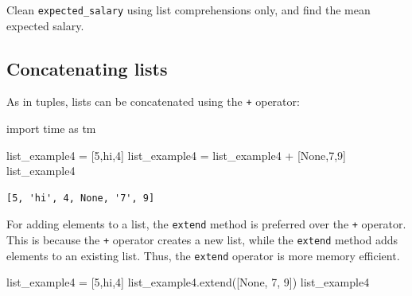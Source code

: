 \documentclass[
  letterpaper,
  DIV=11,
  numbers=noendperiod]{scrreprt}
\newenvironment{Shaded}{\begin{snugshade}}{\end{snugshade}}
\newcommand{\DecValTok}[1]{\textcolor[rgb]{0.68,0.00,0.00}{#1}}
\newcommand{\ImportTok}[1]{\textcolor[rgb]{0.00,0.46,0.62}{#1}}
\newcommand{\NormalTok}[1]{\textcolor[rgb]{0.00,0.23,0.31}{#1}}
\newcommand{\OperatorTok}[1]{\textcolor[rgb]{0.37,0.37,0.37}{#1}}
\newcommand{\StringTok}[1]{\textcolor[rgb]{0.13,0.47,0.30}{#1}}
\newcommand{\VariableTok}[1]{\textcolor[rgb]{0.07,0.07,0.07}{#1}}
\begin{document}
\begin{Shaded}
\begin{Highlighting}[]
}\StringTok{\textquotesingle{}50000\textquotesingle{}}\NormalTok{, }\StringTok{\textquotesingle{}0\textquotesingle{}}\NormalTok{]}
\end{Highlighting}
\end{Shaded}

Clean \texttt{expected\_salary} using list comprehensions only, and find
the mean expected salary.

\hypertarget{concatenating-lists}{%
\subsection{Concatenating lists}\label{concatenating-lists}}

As in tuples, lists can be concatenated using the \texttt{+} operator:

\begin{Shaded}
\begin{Highlighting}[]
\ImportTok{import}\NormalTok{ time }\ImportTok{as}\NormalTok{ tm}
\end{Highlighting}
\end{Shaded}

\begin{Shaded}
\begin{Highlighting}[]
\NormalTok{list\_example4 }\OperatorTok{=}\NormalTok{ [}\DecValTok{5}\NormalTok{,}\StringTok{\textquotesingle{}hi\textquotesingle{}}\NormalTok{,}\DecValTok{4}\NormalTok{] }
\NormalTok{list\_example4 }\OperatorTok{=}\NormalTok{ list\_example4 }\OperatorTok{+}\NormalTok{ [}\VariableTok{None}\NormalTok{,}\StringTok{\textquotesingle{}7\textquotesingle{}}\NormalTok{,}\DecValTok{9}\NormalTok{]}
\NormalTok{list\_example4}
\end{Highlighting}
\end{Shaded}

\begin{verbatim}
[5, 'hi', 4, None, '7', 9]
\end{verbatim}

For adding elements to a list, the \texttt{extend} method is preferred
over the \texttt{+} operator. This is because the \texttt{+} operator
creates a new list, while the \texttt{extend} method adds elements to an
existing list. Thus, the \texttt{extend} operator is more memory
efficient.

\begin{Shaded}
\begin{Highlighting}[]
\NormalTok{list\_example4 }\OperatorTok{=}\NormalTok{ [}\DecValTok{5}\NormalTok{,}\StringTok{\textquotesingle{}hi\textquotesingle{}}\NormalTok{,}\DecValTok{4}\NormalTok{]}
\NormalTok{list\_example4.extend([}\VariableTok{None}\NormalTok{, }\StringTok{\textquotesingle{}7\textquotesingle{}}\NormalTok{, }\DecValTok{9}\NormalTok{])}
\NormalTok{list\_example4}
\end{Highlighting}
\end{Shaded}
\end{document}
